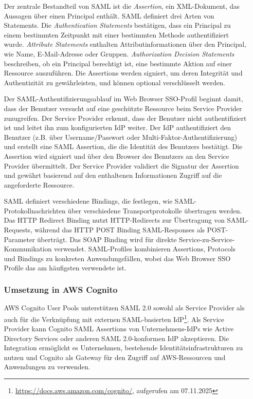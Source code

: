 Der zentrale Bestandteil von  \ac{SAML} ist die \textit{Assertion}, ein XML-Dokument, das Aussagen über einen Principal enthält. \ac{SAML} definiert drei Arten von Statements.
Die \textit{Authentication Statements} bestätigen, dass ein Principal zu einem bestimmten Zeitpunkt mit einer bestimmten Methode authentifiziert wurde. \textit{Attribute Statements} enthalten Attributinformationen über den Principal, wie Name, E-Mail-Adresse oder Gruppen. \textit{Authorization Decision Statements} beschreiben, ob ein Principal berechtigt ist, eine bestimmte Aktion auf einer Ressource auszuführen. Die Assertions werden signiert, um deren Integrität und Authentizität zu gewährleisten, und können optional verschlüsselt werden.

Der \ac{SAML}-Authentifizierungsablauf im Web Browser \ac{SSO}-Profil beginnt damit, dass der Benutzer versucht auf eine geschützte Ressource beim Service Provider zuzugreifen. Der Service Provider erkennt, dass der Benutzer nicht authentifiziert ist und leitet ihn zum konfigurierten \ac{IdP} weiter. Der \ac{IdP} authentifiziert den Benutzer (z.B. über Username/Passwort oder Multi-Faktor-Authentifizierung) und erstellt eine \ac{SAML} Assertion, die die Identität des Benutzers bestätigt. Die Assertion wird signiert und über den Browser des Benutzers an den Service Provider übermittelt. Der Service Provider validiert die Signatur der Assertion und gewährt basierend auf den enthaltenen Informationen Zugriff auf die angeforderte Ressource.

\ac{SAML} definiert verschiedene Bindings, die festlegen, wie \ac{SAML}-Protokollnachrichten über verschiedene Transportprotokolle übertragen werden. Das HTTP Redirect Binding nutzt HTTP-Redirects zur Übertragung von \ac{SAML}-Requests, während das HTTP POST Binding SAML-Responses als POST-Parameter überträgt. Das SOAP Binding wird für direkte Service-zu-Service-Kommunikation verwendet. \ac{SAML}-Profiles kombinieren Assertions, Protocols und Bindings zu konkreten Anwendungsfällen, wobei das Web Browser \ac{SSO} Profile das am häufigsten verwendete ist.

\subsubsection{Umsetzung in AWS Cognito}

AWS Cognito User Pools unterstützen \ac{SAML} 2.0 sowohl als Service Provider als auch für die Verknüpfung mit externen \ac{SAML}-basierten \ac{IdP}\footnote{\url{https://docs.aws.amazon.com/cognito/}, aufgerufen am 07.11.2025}. Als Service Provider kann Cognito \ac{SAML} Assertions von Unternehmens-\ac{IdP}s wie Active Directory Services oder anderen \ac{SAML} 2.0-konformen \ac{IdP} akzeptieren. Die Integration ermöglicht es Unternehmen, bestehende Identitätsinfrastrukturen zu nutzen und Cognito als Gateway für den Zugriff auf AWS-Ressourcen und Anwendungen zu verwenden.

